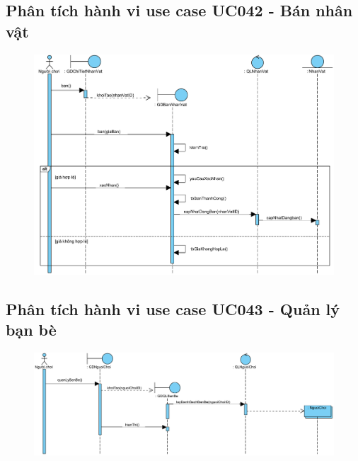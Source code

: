 \documentclass[3p]{elsarticle}
\begin{document}
\subsection{Phân tích hành vi use case UC042 - Bán nhân vật}
\begin{figure}[!htbp]
	\hspace*{-.5in}
	\centering
	\includegraphics[scale=.55]{images/sequence-pdfs/gamer/CharacterManagement_Sell.pdf}
\end{figure}
\newpage

\subsection{Phân tích hành vi use case UC043 - Quản lý bạn bè}
\begin{figure}[!htbp]
	\hspace*{-.5in}
	\centering
	\includegraphics[scale=.5]{images/sequence-pdfs/gamer/FriendManagement.pdf}
\end{figure}
\end{document}
